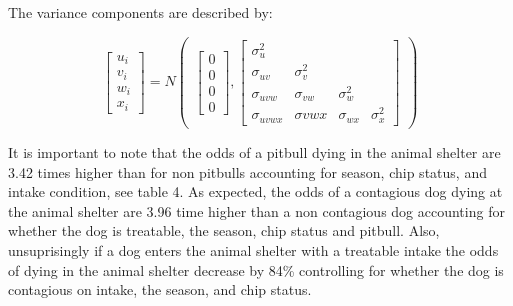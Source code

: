 \documentclass[]{article}
\begin{document}
The variance components are described by:

\[
\begin{bmatrix} u_i \\ v_i \\ w_i\\ x_i \end{bmatrix}=N\begin{pmatrix} \begin{bmatrix} 0 \\ 0 \\ 0 \\ 0 \end{bmatrix}, \begin{bmatrix} \sigma_u^2 & & & \\ \sigma_{uv} & \sigma_v^2 & & \\ \sigma_{uvw} &\sigma_{vw} & \sigma_w^2 & \\ \sigma_{uvwx} & \sigma{vwx} & \sigma_{wx} & \sigma_x^2 \end{bmatrix} \end{pmatrix}
\]

It is important to note that the odds of a pitbull dying in the animal
shelter are 3.42 times higher than for non pitbulls accounting for
season, chip status, and intake condition, see table 4. As expected, the
odds of a contagious dog dying at the animal shelter are 3.96 time
higher than a non contagious dog accounting for whether the dog is
treatable, the season, chip status and pitbull. Also, unsuprisingly if a
dog enters the animal shelter with a treatable intake the odds of dying
in the animal shelter decrease by 84\% controlling for whether the dog
is contagious on intake, the season, and chip status.
\end{document}
